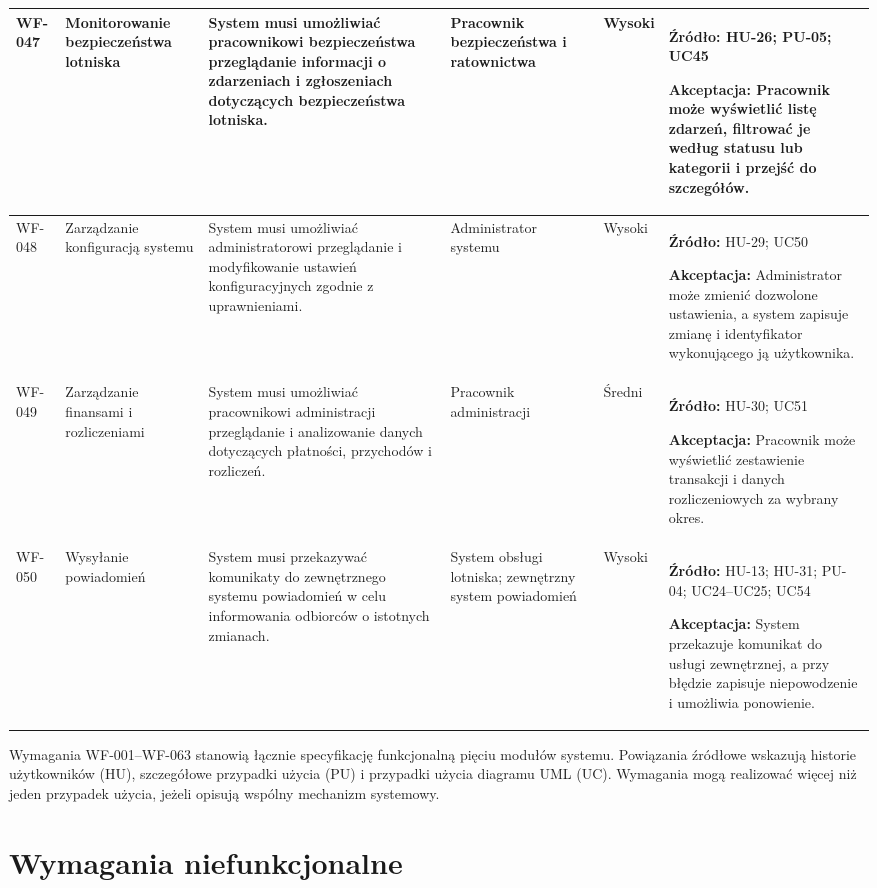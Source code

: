 \documentclass[12pt,a4paper,oneside]{report}
\begin{document}
\begin{longtable}{|p{1.05cm}|p{2.15cm}|p{3.35cm}|p{1.75cm}|p{0.95cm}|p{4.05cm}|}
WF-047 & Monitorowanie bezpieczeństwa lotniska & System musi umożliwiać pracownikowi bezpieczeństwa przeglądanie informacji o zdarzeniach i zgłoszeniach dotyczących bezpieczeństwa lotniska. & Pracownik bezpieczeństwa i ratownictwa & Wysoki & \textbf{Źródło:} HU-26; PU-05; UC45\par\textbf{Akceptacja:} Pracownik może wyświetlić listę zdarzeń, filtrować je według statusu lub kategorii i przejść do szczegółów.\\\hline
WF-048 & Zarządzanie konfiguracją systemu & System musi umożliwiać administratorowi przeglądanie i modyfikowanie ustawień konfiguracyjnych zgodnie z uprawnieniami. & Administrator systemu & Wysoki & \textbf{Źródło:} HU-29; UC50\par\textbf{Akceptacja:} Administrator może zmienić dozwolone ustawienia, a system zapisuje zmianę i identyfikator wykonującego ją użytkownika.\\\hline
WF-049 & Zarządzanie finansami i rozliczeniami & System musi umożliwiać pracownikowi administracji przeglądanie i analizowanie danych dotyczących płatności, przychodów i rozliczeń. & Pracownik administracji & Średni & \textbf{Źródło:} HU-30; UC51\par\textbf{Akceptacja:} Pracownik może wyświetlić zestawienie transakcji i danych rozliczeniowych za wybrany okres.\\\hline
WF-050 & Wysyłanie powiadomień & System musi przekazywać komunikaty do zewnętrznego systemu powiadomień w celu informowania odbiorców o istotnych zmianach. & System obsługi lotniska; zewnętrzny system powiadomień & Wysoki & \textbf{Źródło:} HU-13; HU-31; PU-04; UC24–UC25; UC54\par\textbf{Akceptacja:} System przekazuje komunikat do usługi zewnętrznej, a przy błędzie zapisuje niepowodzenie i umożliwia ponowienie.\\\hline
\end{longtable}
\normalsize

\noindent Wymagania WF-001--WF-063 stanowią łącznie specyfikację funkcjonalną pięciu modułów systemu. Powiązania źródłowe wskazują historie użytkowników (HU), szczegółowe przypadki użycia (PU) i przypadki użycia diagramu UML (UC). Wymagania mogą realizować więcej niż jeden przypadek użycia, jeżeli opisują wspólny mechanizm systemowy.

\chapter{Wymagania niefunkcjonalne}
\end{document}
